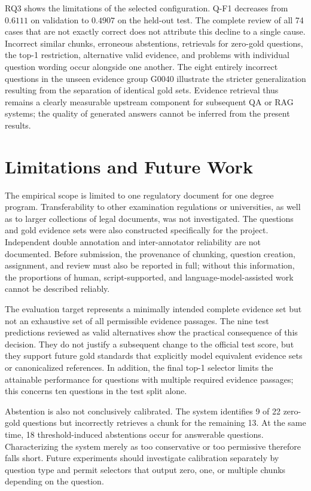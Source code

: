 \documentclass[11pt]{article}
\begin{document}
RQ3 shows the limitations of the selected configuration. Q-F1 decreases from $0.6111$ on validation to $0.4907$ on the held-out test. The complete review of all 74 cases that are not exactly correct does not attribute this decline to a single cause. Incorrect similar chunks, erroneous abstentions, retrievals for zero-gold questions, the top-1 restriction, alternative valid evidence, and problems with individual question wording occur alongside one another. The eight entirely incorrect questions in the unseen evidence group G0040 illustrate the stricter generalization resulting from the separation of identical gold sets. Evidence retrieval thus remains a clearly measurable upstream component for subsequent QA or RAG systems; the quality of generated answers cannot be inferred from the present results.


\section{Limitations and Future Work}

The empirical scope is limited to one regulatory document for one degree program. Transferability to other examination regulations or universities, as well as to larger collections of legal documents, was not investigated. The questions and gold evidence sets were also constructed specifically for the project. Independent double annotation and inter-annotator reliability are not documented. Before submission, the provenance of chunking, question creation, assignment, and review must also be reported in full; without this information, the proportions of human, script-supported, and language-model-assisted work cannot be described reliably.

The evaluation target represents a minimally intended complete evidence set but not an exhaustive set of all permissible evidence passages. The nine test predictions reviewed as valid alternatives show the practical consequence of this decision. They do not justify a subsequent change to the official test score, but they support future gold standards that explicitly model equivalent evidence sets or canonicalized references. In addition, the final top-1 selector limits the attainable performance for questions with multiple required evidence passages; this concerns ten questions in the test split alone.

Abstention is also not conclusively calibrated. The system identifies 9 of 22 zero-gold questions but incorrectly retrieves a chunk for the remaining 13. At the same time, 18 threshold-induced abstentions occur for answerable questions. Characterizing the system merely as too conservative or too permissive therefore falls short. Future experiments should investigate calibration separately by question type and permit selectors that output zero, one, or multiple chunks depending on the question.
\end{document}
